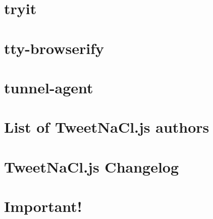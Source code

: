 \documentclass[twoside]{book}
\newcommand{\+}{\discretionary{\mbox{\scriptsize$\hookleftarrow$}}{}{}}
\begin{document}
\chapter{tryit}
\label{md__c_1_workspace_demo_src_main_script_node_modules_tryit__r_e_a_d_m_e}

\chapter{tty-\/browserify}
\label{md__c_1_workspace_demo_src_main_script_node_modules_tty-browserify_readme}

\chapter{tunnel-\/agent}
\label{md__c_1_workspace_demo_src_main_script_node_modules_tunnel-agent__r_e_a_d_m_e}

\chapter{List of Tweet\+Na\+Cl.\+js authors}
\label{md__c_1_workspace_demo_src_main_script_node_modules_tweetnacl__a_u_t_h_o_r_s}

\chapter{Tweet\+Na\+Cl.\+js Changelog}
\label{md__c_1_workspace_demo_src_main_script_node_modules_tweetnacl__c_h_a_n_g_e_l_o_g}

\chapter{Important!}
\label{md__c_1_workspace_demo_src_main_script_node_modules_tweetnacl__p_u_l_l__r_e_q_u_e_s_t__t_e_m_p_l_a_t_e}

\end{document}
